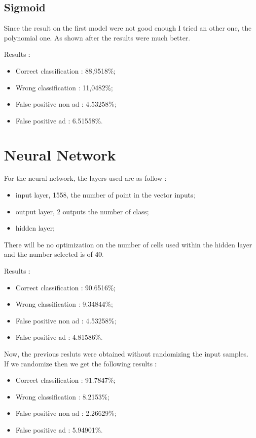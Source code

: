 \subsection{Sigmoid}

Since the result on the first model were not good enough I tried an other one, the polynomial one. As shown after the results were much better.

Results :
\begin{itemize}
  \item Correct classification : 88,9518\%;
  \item Wrong classification : 11,0482\%;
  \item False positive non ad : 4.53258\%;
  \item False positive ad : 6.51558\%.
\end{itemize}

\section{Neural Network}
For the neural network, the layers used are as follow :
  \begin{itemize}
    \item input layer, 1558, the number of point in the vector inputs;
    \item output layer, 2 outputs the number of class;
    \item hidden layer;
  \end{itemize}
  There will be no optimization on the number of cells used within the hidden layer and the number selected is of 40.

  Results :
  \begin{itemize}
    \item Correct classification : 90.6516\%;
    \item Wrong classification : 9.34844\%;
    \item False positive non ad : 4.53258\%;
    \item False positive ad : 4.81586\%.
  \end{itemize}

  Now, the previous resluts were obtained without randomizing the input samples. If we randomize then we get the following results :
  \begin{itemize}
    \item Correct classification : 91.7847\%;
    \item Wrong classification : 8.2153\%;
    \item False positive non ad : 2.26629\%;
    \item False positive ad : 5.94901\%.
  \end{itemize}

